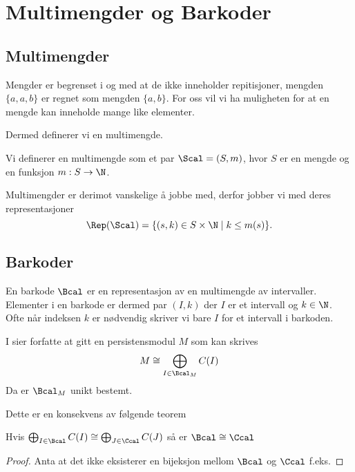 \section{Multimengder og Barkoder}

\subsection{Multimengder}
Mengder er begrenset i og med at de ikke inneholder repitisjoner, mengden $\{a,a,b\}$ er regnet som mengden $\{a,b\}$. For oss vil vi ha muligheten for at en mengde kan inneholde mange like elementer.

Dermed definerer vi en multimengde.
\begin{definition}\label{Def:label}
    Vi definerer en multimengde som et par $\Scal = (S,m)$, hvor $S$ er en mengde og en funksjon $m: S\to\N$.
\end{definition}

Multimengder er derimot vanskelige å jobbe med, derfor jobber vi med deres representasjoner
\[\Rep(\Scal) = \{(s,k)\in S\times\N\;|\; k \leq m(s)\}.\]

\subsection{Barkoder}
En barkode $\Bcal$ er en representasjon av en multimengde av intervaller. Elementer i en barkode er dermed par $(I,k)$ der $I$ er et intervall og $k\in\N$. Ofte når indeksen $k$ er nødvendig skriver vi bare $I$ for et intervall i barkoden.

I \cite{Bauer2015a} sier forfatte at gitt en persistensmodul $M$ som kan skrives
\[M\cong\bigoplus_{I\in\Bcal_M}C(I)\]
Da er $\Bcal_M$ unikt bestemt.

Dette er en konsekvens av følgende teorem

\begin{theorem}\label{Thrm:label}
    Hvis $\bigoplus_{I\in\Bcal}C(I)\cong\bigoplus_{J\in\Ccal} C(J)$ så er $\Bcal\cong\Ccal$
\end{theorem}
\begin{proof}
Anta at det ikke eksisterer en bijeksjon mellom $\Bcal$ og $\Ccal$ f.eks. 
\end{proof}
